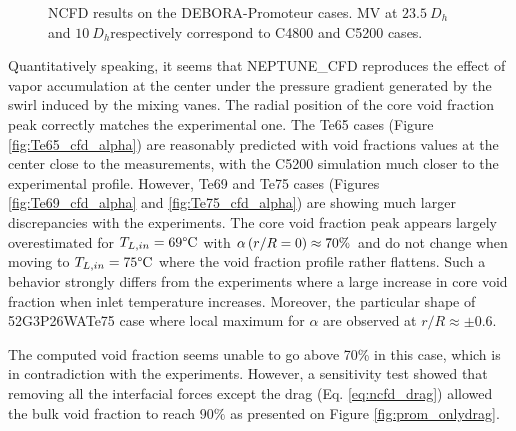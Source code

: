 \begin{figure}[!htb]
{\label{fig:Te69_cfd_Uvap}
}
\caption{NCFD results on the DEBORA-Promoteur cases. MV at $23.5\ D_{h}$ and $10\ D_{h}$respectively correspond to C4800 and C5200 cases.}
\label{fig:debprom_ncfd}
\end{figure}
%



\clearpage



Quantitatively speaking, it seems that NEPTUNE\_CFD reproduces the effect of vapor accumulation at the center under the pressure gradient generated by the swirl induced by the mixing vanes. The radial position of the core void fraction peak correctly matches the experimental one. The Te65 cases (Figure \ref{fig:Te65_cfd_alpha}) are reasonably predicted with void fractions values at the center close to the measurements, with the C5200 simulation much closer to the experimental profile. However, Te69 and Te75 cases (Figures \ref{fig:Te69_cfd_alpha} and \ref{fig:Te75_cfd_alpha}) are showing much larger discrepancies with the experiments. The core void fraction peak appears largely overestimated for $T_{L,in}=69\degree\mathrm{C}$ with $\alpha\left( r/R= 0 \right) \approx 70\%$ and do not change when moving to $T_{L,in}=75\degree\mathrm{C}$ where the void fraction profile rather flattens. Such a behavior strongly differs from the experiments where a large increase in core void fraction when inlet temperature increases. Moreover, the particular shape of 52G3P26WATe75 case where local maximum for $\alpha$ are observed at $r/R \approx \pm 0.6$.

\begin{remark*}{}
The computed void fraction seems unable to go above 70\% in this case, which is in contradiction with the experiments. However, a sensitivity test showed that removing all the interfacial forces except the drag (Eq. \ref{eq:ncfd_drag}) allowed the bulk void fraction to reach $90\%$ as presented on Figure \ref{fig:prom_onlydrag}.

\end{remark*}

